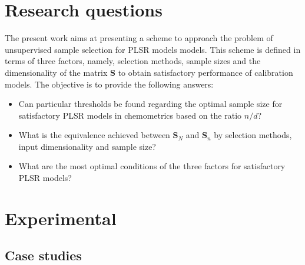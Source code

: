 \documentclass[journal=ancham,manuscript=article]{achemso}
\begin{document}
\section{Research questions}

The present work aims at presenting a scheme to approach the problem of unsupervised sample selection for PLSR models models. This scheme is defined in terms of three factors, namely, selection methods, sample sizes and the dimensionality of the matrix $\mathbf{S}$ to obtain satisfactory performance of calibration models. The objective is to provide the following answers:

\begin{itemize}

    \item Can particular thresholds be found regarding the optimal sample size for satisfactory PLSR models in chemometrics based on the ratio $n/d$?

    \item What is the equivalence achieved between $\mathbf{S}_N$ and $\mathbf{S}_n$ by selection methods, input dimensionality and sample size?
    
    \item What are the most optimal conditions of the three factors for satisfactory PLSR models?

\end{itemize}


\section{Experimental}\label{experimental}

\subsection{Case studies}\label{data}
\end{document}
